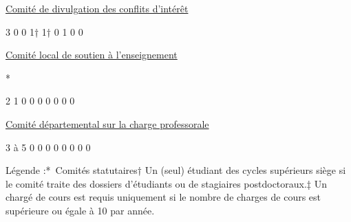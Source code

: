 \documentclass [12 pt]{article}
\begin{document}
                        
                            
                                
        \href{
        https://wiki.umontreal.ca/pages/viewpage.action?pageId=124095459#ci
        } {
        Comité de divulgation des conflits d'intérêt
        }
    
                            
                            3
                            0
                            0
                            1†
                            1†
                            0
                            1
                            0
                            0
                        
                        
                            
                                
        \href{
        https://wiki.umontreal.ca/pages/viewpage.action?pageId=124095459#close
        } {
        Comité local de soutien à l'enseignement
        }
    
                                *
                            
                            2
                            1
                            0
                            0
                            0
                            0
                            0
                            0
                            0
                        
                        
                            
                                
        \href{
        https://wiki.umontreal.ca/pages/viewpage.action?pageId=124095459#codchap
        } {
        Comité départemental sur la charge
                                    professorale
        }
    
                            
                            3 à 5
                            0
                            0
                            0
                            0
                            0
                            0
                            0
                            0
                        
                    
                
            
            Légende :* Comités statutaires† Un (seul) étudiant
                des cycles supérieurs siège si le comité traite des dossiers d'étudiants ou de
                stagiaires postdoctoraux.‡ Un chargé de cours est requis uniquement si le
                nombre de charges de cours est supérieure ou égale à 10 par année.
            
\end{document}
